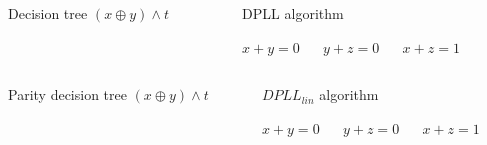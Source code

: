 \begin{frame}
    \begin{columns}
        \begin{column}{5cm}
            Decision tree
            $(x \oplus y) \land t$
            
			
        \end{column}
        \begin{column}{5cm}
            DPLL algorithm
            
            $x + y = 0$ ~~
            $y + z = 0$ ~~
            $x + z = 1$
            
            
        \end{column}
    \end{columns}

\end{frame}

\begin{frame}
    \begin{columns}
        \begin{column}{5cm}
            Parity decision tree
            $(x \oplus y) \land t$
            
			
        \end{column}
        \begin{column}{5cm}
            $DPLL_{lin}$ algorithm
            
            $x + y = 0$ ~~
            $y + z = 0$ ~~
            $x + z = 1$
            
            
        \end{column}
    \end{columns}

\end{frame}


